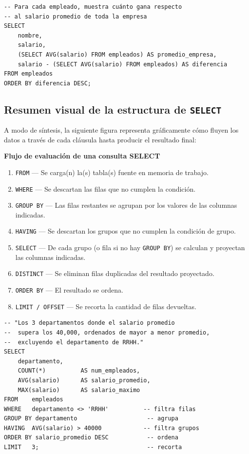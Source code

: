 \begin{lstlisting}[caption={Subconsulta escalar en la lista de columnas.}]
-- Para cada empleado, muestra cuánto gana respecto
-- al salario promedio de toda la empresa
SELECT
    nombre,
    salario,
    (SELECT AVG(salario) FROM empleados) AS promedio_empresa,
    salario - (SELECT AVG(salario) FROM empleados) AS diferencia
FROM empleados
ORDER BY diferencia DESC;
\end{lstlisting}

\subsection{Resumen visual de la estructura de \texttt{SELECT}}

A modo de síntesis, la siguiente figura representa gráficamente
cómo fluyen los datos a través de cada cláusula hasta producir el
resultado final:

\begin{ejemplo}
\textbf{Flujo de evaluación de una consulta SELECT}

\begin{enumerate}
  \item \texttt{FROM} — Se carga(n) la(s) tabla(s) fuente en memoria
        de trabajo.
  \item \texttt{WHERE} — Se descartan las filas que no cumplen la
        condición.
  \item \texttt{GROUP BY} — Las filas restantes se agrupan por los
        valores de las columnas indicadas.
  \item \texttt{HAVING} — Se descartan los grupos que no cumplen la
        condición de grupo.
  \item \texttt{SELECT} — De cada grupo (o fila si no hay \texttt{GROUP BY})
        se calculan y proyectan las columnas indicadas.
  \item \texttt{DISTINCT} — Se eliminan filas duplicadas del resultado
        proyectado.
  \item \texttt{ORDER BY} — El resultado se ordena.
  \item \texttt{LIMIT / OFFSET} — Se recorta la cantidad de filas
        devueltas.
\end{enumerate}
\end{ejemplo}

\begin{lstlisting}[caption={Consulta que usa todas las cláusulas.}]
-- "Los 3 departamentos donde el salario promedio
--  supera los 40,000, ordenados de mayor a menor promedio,
--  excluyendo el departamento de RRHH."
SELECT
    departamento,
    COUNT(*)          AS num_empleados,
    AVG(salario)      AS salario_promedio,
    MAX(salario)      AS salario_maximo
FROM    empleados
WHERE   departamento <> 'RRHH'          -- filtra filas
GROUP BY departamento                    -- agrupa
HAVING  AVG(salario) > 40000            -- filtra grupos
ORDER BY salario_promedio DESC           -- ordena
LIMIT   3;                               -- recorta
\end{lstlisting}
\newpage
\newpage
